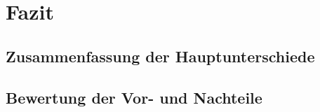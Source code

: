 \chapter{Fazit}
\section{Zusammenfassung der Hauptunterschiede}
\section{Bewertung der Vor- und Nachteile}
